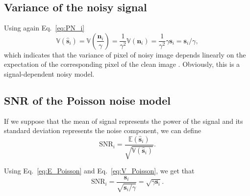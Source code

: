 \subsection{Variance of the noisy signal}
Using again Eq.~\ref{eq:PN_i}
\begin{equation}
  \mathbb{V}(\hat{\mathbf{s}}_i) = \mathbb{V}\left(\frac{\mathbf{n}_i}{\gamma}\right) = \frac{1}{\gamma^2}\mathbb{V}(\mathbf{n}_i) = \frac{1}{\gamma^2}\gamma\mathbf{s}_i = \mathbf{s}_i/\gamma,
  \label{eq:V_Poisson}
\end{equation}
which indicates that the variance of pixel of noisy image depends
linearly on the expectation of the corresponding pixel of the clean
image \cite{foi2008practical}. Obviously, this is a signal-dependent
noisy model.

\begin{comment}
In the exteme case where $\mathbf{s}=\mathbf{0}$, we get that
\begin{equation}
  \mathbb{E}(\hat{\mathbf{s}}) = 0,
\end{equation}
and
\begin{equation}
  \mathbb{V}(\hat{\mathbf{s}}) = 0.
\end{equation}
If $\mathbf{s}=\mathbf{1}$, then
\begin{equation}
  \mathbb{E}(\hat{\mathbf{s}}) = 1,
\end{equation}
and
\begin{equation}
  \mathbb{V}(\hat{\mathbf{s}}) = 1/\gamma.
\end{equation}
\end{comment}

\subsection{\gls{SNR} of the Poisson noise model}

If we suppose that the mean of signal represents the power of the signal and its standard
deviation represents the noise component, we can define
\begin{equation}
  \text{SNR}_i = \frac{\mathbb{E}(\hat{\mathbf{s}}_i)}{\sqrt{\mathbb{V}(\hat{\mathbf{s}}_i)}}.
  \label{eq:SNR_mean_deviation}
\end{equation}

Using Eq.~\ref{eq:E_Poisson} and Eq.~\ref{eq:V_Poisson}, we get that
\begin{equation}
  \text{SNR}_i = \frac{\mathbf{s}_i}{\sqrt{\mathbf{s}_i/\gamma}} = \sqrt{\gamma\mathbf{s}_i}.
  \label{eq:SNR_Poisson}
\end{equation}

